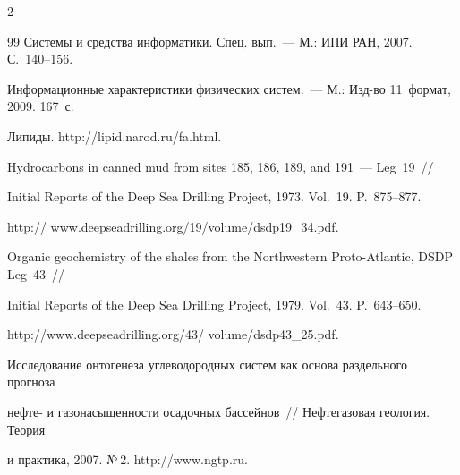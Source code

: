 \begin{multicols}{2}
{{\begin{thebibliography}{99}
Системы и средства информатики. Спец. вып.~--- М.: ИПИ РАН, 2007. С.~140--156.





Информационные характеристики физических систем.~--- М.: Изд-во 11~формат, 2009. 167~с.






Липиды. {\sf http://lipid.narod.ru/fa.html}.







Hydrocarbons in canned mud from sites 185, 186, 189, and 191~--- Leg~19~//

Initial Reports of the Deep Sea Drilling Project, 1973. Vol.~19. P.~875--877. 

{\sf http:// www.deepseadrilling.org/19/volume/dsdp19\_34.pdf}. 





Organic geochemistry of the shales from the Northwestern Proto-Atlantic, DSDP Leg~43~//

Initial Reports of the Deep Sea Drilling Project, 1979. Vol.~43. P.~643--650. 

{\sf http://www.deepseadrilling.org/43/ volume/dsdp43\_25.pdf}.



\label{end\stat}





Исследование онтогенеза углеводородных систем как основа раздельного прогноза 

нефте- и газонасыщенности осадочных бассейнов~// Нефтегазовая геология. Теория 

и практика, 2007. №\,2. {\sf http://www.ngtp.ru}.















 \end{thebibliography}}}%

\end{multicols}

     

